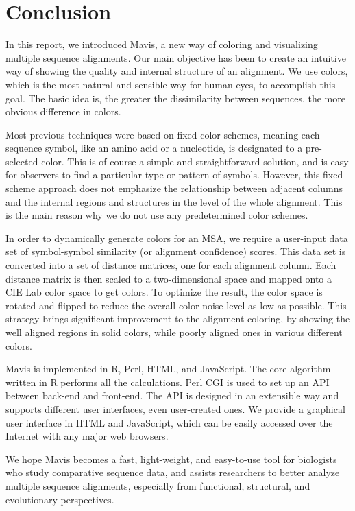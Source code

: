 \chapter{Conclusion}\label{chap:Conclusion}

In this report, we introduced Mavis, a new way of coloring and visualizing multiple sequence alignments. Our main objective has been to create an intuitive way of showing the quality and internal structure of an alignment. We use colors, which is the most natural and sensible way for human eyes, to accomplish this goal. The basic idea is, the greater the dissimilarity between sequences, the more obvious difference in colors.

Most previous techniques were based on fixed color schemes, meaning each sequence symbol, like an amino acid or a nucleotide, is designated to a pre-selected color. This is of course a simple and straightforward solution, and is easy for observers to find a particular type or pattern of symbols. However, this fixed-scheme approach does not emphasize the relationship between adjacent columns and the internal regions and structures in the level of the whole alignment. This is the main reason why we do not use any predetermined color schemes.

In order to dynamically generate colors for an MSA, we require a user-input data set of symbol-symbol similarity (or alignment confidence) scores. This data set is converted into a set of distance matrices, one for each alignment column. Each distance matrix is then scaled to a two-dimensional space and mapped onto a CIE Lab color space to get colors. To optimize the result, the color space is rotated and flipped to reduce the overall color noise level as low as possible. This strategy brings significant improvement to the alignment coloring, by showing the well aligned regions in solid colors, while poorly aligned ones in various different colors.

Mavis is implemented in R, Perl, HTML, and JavaScript. The core algorithm written in R performs all the calculations. Perl CGI is used to set up an API between back-end and front-end. The API is designed in an extensible way and supports different user interfaces, even user-created ones. We provide a graphical user interface in HTML and JavaScript, which can be easily accessed over the Internet with any major web browsers.

We hope Mavis becomes a fast, light-weight, and easy-to-use tool for biologists who study comparative sequence data, and assists researchers to better analyze multiple sequence alignments, especially from functional, structural, and evolutionary perspectives.
